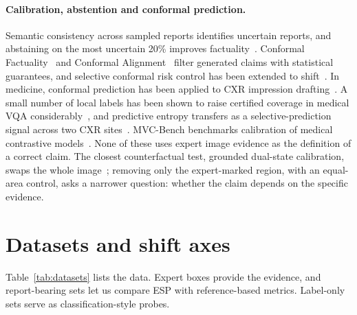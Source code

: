 \documentclass[pdflatex,sn-mathphys-num]{sn-jnl}
\theoremstyle{thmstyleone}
\begin{document}
\paragraph{Calibration, abstention and conformal prediction.} Semantic consistency across sampled reports identifies uncertain reports, and abstaining on the most uncertain 20\% improves factuality~\cite{semcons}. Conformal Factuality~\cite{conffact} and Conformal Alignment~\cite{confalign} filter generated claims with statistical guarantees, and selective conformal risk control has been extended to shift~\cite{score}. In medicine, conformal prediction has been applied to CXR impression drafting~\cite{conrep}. A small number of local labels has been shown to raise certified coverage in medical VQA considerably~\cite{adaptcal}, and predictive entropy transfers as a selective-prediction signal across two CXR sites~\cite{entropyshift}. MVC-Bench benchmarks calibration of medical contrastive models~\cite{mvcbench}. None of these uses expert image evidence as the definition of a correct claim. The closest counterfactual test, grounded dual-state calibration, swaps the whole image~\cite{dualread}; removing only the expert-marked region, with an equal-area control, asks a narrower question: whether the claim depends on the specific evidence.

\section{Datasets and shift axes}\label{sec:data}

Table~\ref{tab:datasets} lists the data. Expert boxes provide the evidence, and report-bearing sets let us compare ESP with reference-based metrics. Label-only sets serve as classification-style probes.
\end{document}
